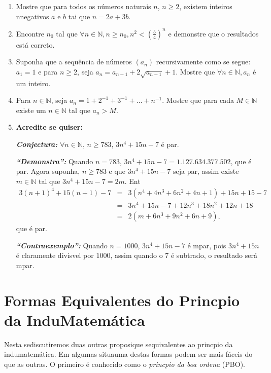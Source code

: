 \begin{enumerate}[{\bf 1.}]
\item Mostre que para todos os n\'umeros naturais $n$, $n\geq 2$, existem inteiros n\ao negativos $a$ e $b$ tai que $n=2a+3b$.

\item Encontre $n_0$ tal que $\forall n\in\mathbb{N}, n\geq n_0, n^2<(\frac{5}{4})^n$ e demonstre que o resultados est\'a correto.

\item Suponha que a sequ\^encia de n\'umeros $(a_n)$ recursivamente como se segue: $a_1=1$ e para $n\geq 2$, seja $a_n=a_{n-1}+2\sqrt{a_{n-1}}+1$. Mostre que $\forall n\in\mathbb{N}, a_n$ \'e um inteiro.

\item Para $n\in\mathbb{N}$, seja $a_n=1+2^{-1}+3^{-1}+\ldots+n^{-1}$. Mostre que para cada $M\in\mathbb{N}$ existe um $n\in\mathbb{N}$ tal que $a_n>M$.

\item {\bf Acredite se quiser:}  

\noindent \textit{\textbf{Conjectura:}} $\forall n\in\mathbb{N}$, $n\geq 783$, $3n^4+15n-7$ \'e par.

\noindent \textit{\textbf{``Demonstra\caoi'':}} Quando $n=783$, $3n^4+15n-7=1.127.634.377.502$, que \'e par. Agora suponha, $n\geq 783$ e que $3n^4+15n-7$ seja par, assim existe $m\in\mathbb{N}$ tal que $3n^4+15n-7=2m$. Ent\ao
\begin{eqnarray*}
3(n+1)^4+15(n+1)-7&=& 3(n^4+4n^3+6n^2+4n+1)+15n+15-7\\
                  &=& 3n^4+15n-7+12n^3+18n^2+12n+18 \\
                  &=& 2(m+6n^3+9n^2+6n+9),
\end{eqnarray*}  
que \'e par.   

\noindent \textit{\textbf{``Contraexemplo'':}} Quando $n=1000$, $3n^4+15n-7$ \'e \ih mpar, pois $3n^4+15n$ \'e claramente divis\ih vel por $1000$, assim quando o $7$ \'e subtra\ih do, o resultado ser\'a \ih mpar.
\end{enumerate}

\section{Formas Equivalentes do Princ\ih pio da Indu\cao Matem\'atica}\label{eqvinducao}

Nesta se\cao discutiremos duas outras proposi\coes que s\ao equivalentes ao princ\ih pio da indu\cao matem\'atica. Em algumas situa\coes uma destas formas podem ser mais f\'aceis do que as outras. O primeiro \'e conhecido como o {\it princ\ih pio da boa ordena\cao} (PBO).
\\
\\

